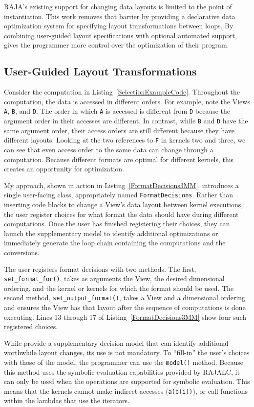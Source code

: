 RAJA's existing support for changing data layouts is limited to the point of instantiation.
This work removes that barrier by providing a declarative data optimization system for specifying layout transformations between loops.
By combining user-guided layout specifications with optional automated support, \FormatDecisions{} gives the programmer more control over the optimization of their program.

\subsection{User-Guided Layout Transformations}

Consider the computation in Listing~\ref{SelectionExampleCode}.
Throughout the computation, the data is accessed in different orders.
For example, note the Views \verb.A., \verb.B., and \verb.D..
The order in which \verb.A. is accessed is different from \verb.D. because the argument order in their accesses are different.
In contrast, while \verb.B. and \verb.D. have the same argument order, their access orders are still different because they have different layouts.
Looking at the two references to \verb.F. in kernels two and three, we can see that even access order to the same data can change through a computation.
Because different formats are optimal for different kernels, this creates an opportunity for optimization. 

My approach, shown in action in Listing~\ref{FormatDecisions3MM}, introduces a single user-facing class, appropriately named \verb.FormatDecisions..
Rather than inserting code blocks to change a View's data layout between kernel executions, the user register choices for what format the data should have during different computations. 
Once the user has finished registering their choices, they can launch the supplementary model to identify additional optimizations or immediately generate the loop chain containing the computations and the conversions.

The user registers format decisions with two methods.
The first, \verb.set_format_for()., takes as arguments the View, the desired dimensional ordering, and the kernel or kernels for which the format should be used.
The second method, \verb.set_output_format()., takes a View and a dimensional ordering and ensures the View has that layout after the sequence of computations is done executing.
Lines 13 through 17 of Listing~\ref{FormatDecisions3MM} show four such registered choices.

While \FormatDecisions{} provide a supplementary decision model that can identify additional worthwhile layout changes, its use is not mandatory.
To ``fill-in'' the user's choices with those of the model, the programmer can use the \verb.model(). method.
Because this method uses the symbolic evaluation capabilities provided by RAJALC, it can only be used when the operations are supported for symbolic evaluation.
This means that the kernels cannot make indirect accesses (\verb.a(b(i)).), or call functions within the lambdas that use the iterators.

